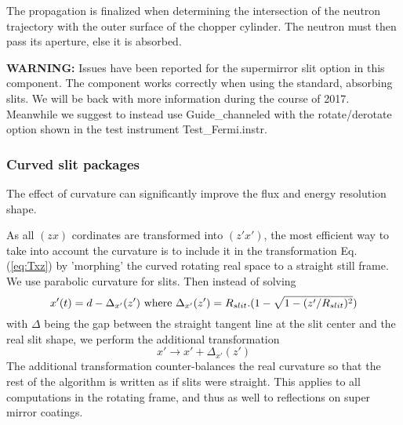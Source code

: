 The propagation is finalized when determining the intersection of the neutron trajectory with the outer surface of the chopper cylinder. The neutron must then pass its aperture, else it is absorbed.

{\bf WARNING:} Issues have been reported for the supermirror slit option in this component. The component works correctly when using the standard, absorbing slits. We will be back with more information during the course of 2017. Meanwhile we suggest to instead use Guide\_channeled with the rotate/derotate option shown in the test instrument Test\_Fermi.instr. 

\subsubsection{Curved slit packages}

The effect of curvature can significantly improve the flux and energy resolution shape.

As all $(zx)$ cordinates are transformed into $(z'x')$, the most efficient way to take into account the curvature is to include it in the transformation Eq. (\ref{eq:Txz}) by 'morphing' the curved rotating real space to a straight still frame. We use parabolic curvature for slits. Then instead of solving
\begin{equation}x'(t) = d - \Delta_{x'}(z') {\rm\ where\ } \Delta_{x'}(z')=R_{slit}.(1-\sqrt{1-(z'/R_{slit})^2})
\end{equation}
with $\Delta$ being the gap between the straight tangent line at the slit center and the real slit shape, we perform the additional transformation
\begin{equation}
x' \rightarrow x' + \Delta_{x'}(z')
\end{equation}
The additional transformation counter-balances the real curvature so that the rest of the algorithm is written as if slits were straight.
This applies to all computations in the rotating frame, and thus as well to reflections on super mirror coatings.

